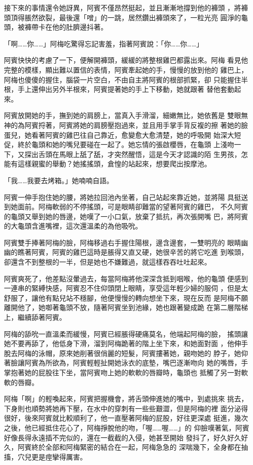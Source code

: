 接下來的事情還令她訝異，阿賓不僅昂然挺起，並且漸漸地撐到他的褲頭
，將褲頭頂得脹然欲裂，最後還「噌」的一跳，居然鑽出褲頭來了，一粒光亮
圓淨的龜頭，被褲帶卡在他的肚臍邊抖著。

「啊……你……」阿梅吃驚得忘記害羞，指著阿賓說：「你……你……」

阿賓快快的考慮了一下，便解開褲頭，緩緩的將整根雞巴都露出來。阿梅
看見他完整的模樣，顯出難以置信的表情，阿賓牽起她的手，慢慢的放到他的
雞巴上，阿梅也傻傻的握住，腦袋一片空白，不由自主將阿賓的根部抓緊，卻
只能握住半根，手上還伸出另外半根來，阿賓提著她的手上下移動，她就跟著
替他套動起來。

阿賓放開她的手，撫到她的肩膀上，當真入手滑溜，細嫩無比，她依舊是
雙眼無神的為阿賓捋著，阿賓將她的肩膀壓抱過來，並且用手掌手背反複的擦
著她的臉蛋兒，她看著阿賓的雞巴往自己靠近，愈變愈大愈清楚，她的呼吸開
始深大短促，終於龜頭和她的嘴兒要碰在一起了。她忘情的張啟櫻唇，在龜頭
上淺吻一下，又探出舌頭在馬眼上舐了舐，才突然醒悟，這是今天才認識的陌
生男孩，怎能有這樣親蜜的舉動？她搖搖頭，倉惶的站起來，想要爬出按摩池。

「我……我要去烤箱。」她喃喃自語。

阿賓一伸手抱住她的腰，將她拉回池內坐著，自己站起來靠近她，並將陽
具挺送到她面前。阿梅軟弱的不停搖頭，可是眼睛卻難當的望著阿賓的雞巴，
不久阿賓的龜頭又舉到她的唇邊，她嘆了一小口氣，放棄了抵抗，再次張開嘴
巴，將阿賓的大龜頭含進嘴裡，這次還溫柔的為他吸吮。

阿賓雙手捧著阿梅的臉，阿梅移過右手握住陽根，邊含邊套，一雙明亮的
眼睛幽幽的瞧著阿賓，阿賓的雞巴這時是脹得又直又硬，她很辛苦的將它吃進
到喉頭，卻還含不到整根的一半，但是她也不嫌難過，就這樣吞吞吐吐起來。

阿賓爽死了，他差點沒暈過去，每當阿梅將他深深含抵到咽喉，他的龜頭
便感到一連串的緊縛快感，阿賓忍不住仰頭閉上眼睛，享受這年輕少婦的服伺
，但是太舒服了，讓他有點兒站不穩腳，他便慢慢的轉向想坐下來，現在反而
是阿梅不願離開他了，她啣著龜頭不放，隨著阿賓坐到池緣，她也跟著變成跪
在第二層階梯上，繼續舔著阿賓。

阿梅的舔吮一直溫柔而緩慢，阿賓已經脹得硬痛莫名，他端起阿梅的臉，
搖頭讓她不要再舔了，他低身下滑，溜到阿梅跪著的階上坐下來，和她面對面
，他伸手脫去阿梅的泳帽，原來她削著很俏麗的短髮，阿賓摟著她，親吻她的
脖子，她仰著臉讓阿賓為所欲為，阿賓輕輕扯開她泳衣的底墊，嘴巴逐漸吻向
她的嘴唇，手掌抱著她的屁股往下坐，當阿賓吻上她的軟軟的唇瓣時，龜頭也
抵觸了另一對軟軟的唇瓣。

阿梅「啊」的輕喚起來，阿賓把握機會，將舌頭伸進她的嘴中，到處挑來
挑去，下身則也順勢將她再下壓，在水中的穿刺有一些些艱澀，但是阿梅的裡
面分泌得很好，後來阿賓就比較順利了，他一直壓著阿梅的屁股，好往更深處
挺進，幾次之後，他已經抵住花心了，阿梅掙脫他的吻，「喔……喔……」的
仰臉嘆著氣，阿賓好像長得永遠插不完似的，還在一截截的入侵，她甚至開始
發抖了，好久好久好久，阿賓終於全部和阿梅緊密的結合在一起，阿梅急急的
深喘幾下，全身都在抽搐，穴兒更是痙攣得厲害。


